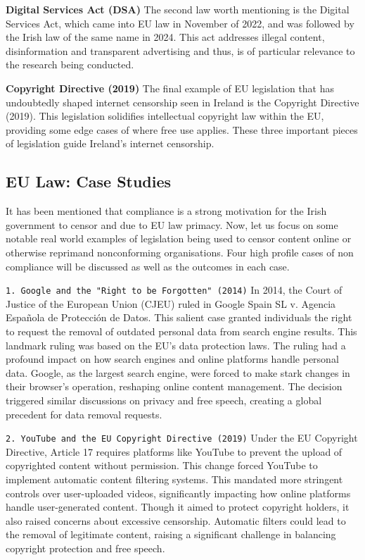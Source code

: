 \textbf{Digital Services Act (DSA)}
The second law worth mentioning is the Digital Services Act, which came into EU law in November of 2022, and was followed by the Irish law of the same name in 2024. \cite{enterprisegovie2025} \cite{irishstatutebook2024} This act addresses illegal content, disinformation and transparent advertising and thus, is of particular relevance to the research being conducted. 

\textbf{Copyright Directive (2019)}
The final example of EU legislation that has undoubtedly shaped internet censorship seen in Ireland is the Copyright Directive (2019). This legislation solidifies intellectual copyright law within the EU, providing some edge cases of where free use applies. \cite{EUCopyright} These three important pieces of legislation guide Ireland's internet censorship. 

\subsection{EU Law: Case Studies}
It has been mentioned that compliance is a strong motivation for the Irish government to censor and due to EU law primacy. Now, let us focus on some notable real world examples of legislation being used to censor content online or otherwise reprimand nonconforming organisations. Four high profile cases of non compliance will be discussed as well as the outcomes in each case. 

\texttt{1. Google and the "Right to be Forgotten" (2014)}
In 2014, the Court of Justice of the European Union (CJEU) ruled in Google Spain SL v. Agencia Española de Protección de Datos. This salient case granted individuals the right to request the removal of outdated personal data from search engine results. \cite{google2014} This landmark ruling was based on the EU's data protection laws. The ruling had a profound impact on how search engines and online platforms handle personal data. Google, as the largest search engine, were forced to make stark changes in their browser's operation, reshaping online content management. The decision triggered similar discussions on privacy and free speech, creating a global precedent for data removal requests.

\texttt{2. YouTube and the EU Copyright Directive (2019)}
Under the EU Copyright Directive, Article 17 requires platforms like YouTube to prevent the upload of copyrighted content without permission. \cite{eu2019} This change forced YouTube to implement automatic content filtering systems. This mandated more stringent controls over user-uploaded videos, significantly impacting how online platforms handle user-generated content. Though it aimed to protect copyright holders, it also raised concerns about excessive censorship. Automatic filters could lead to the removal of legitimate content, raising a significant challenge in balancing copyright protection and free speech.


